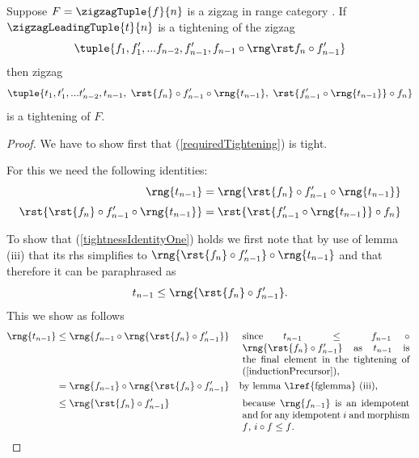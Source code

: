 {  %
   

\newcommand{\requiredTightening}
{\tuple{t_1,t'_1,...t'_{n-2},t_{n-1},\; 
    \rst{f_n} \circ f'_{n-1} \circ \rng{t_{n-1}},\; 
    \rst{f'_{n-1} \circ \rng{t_{n-1}}} \circ f_n
    }
}

\begin{lemma}

Suppose  $F=\zigzagTuple{f}{n}$ is a zigzag in range category \catcw.
If  $\zigzagLeadingTuple{t}{n}$ is a tightening of the zigzag
\begin{equation}
\label{inductionPrecursor}
\tuple{\tightlead}
\end{equation}
then  zigzag
\begin{equation}
\label{requiredTightening}\requiredTightening
\end{equation}
is a tightening of $F$. 


\end{lemma}
\begin{proof}
We have to show first that (\ref{requiredTightening}) is tight. 

For this we need the following identities:
\begin{align}
\label{tightnessIdentityOne}
\rng{t_{n-1}} &= \rng{\rst{f_n} \circ f'_{n-1} \circ \rng{t_{n-1}}}  \\[0.1cm]
\label{tightnessIdentityTwo}
\rst{\rst{f_n} \circ f'_{n-1} \circ \rng{t_{n-1}}}&=\rst{\rst{f'_{n-1} \circ \rng{t_{n-1}}} \circ f_n}
\end{align}

To show that (\ref{tightnessIdentityOne}) holds 
we first note that by use of lemma  (iii) 
that its rhs simplifies to 
$\rng{\rst{f_n} \circ f'_{n-1}} \circ \rng{t_{n-1}}$ 
and that therefore  it
can be paraphrased as
\[
t_{n-1} \leq \rng{\rst{f_n} \circ f'_{n-1}}.
\]
This we show as follows
\newcommand{\stepOneReason}{
\parbox[t]{6cm}{
since
$t_{n-1} \leq  f_{n-1} \circ 
       \rng{
                \rst{f_n} \circ f'_{n-1}
                     }
$
as $t_{n-1}$ is the final element in the tightening
of (\ref{inductionPrecursor}),
} }
\newcommand{\stepThreeReason}{
\parbox[t]{6cm}{
because $\rng{f_{n-1}}$ is an idempotent
and 
for any idempotent $i$ and morphism $f$, $i \circ f \leq f$.
} }
\begin{align*}
\rng{t_{n-1}} &\leq  \rng{
       f_{n-1} \circ 
       \rng{
                \rst{f_n} \circ f'_{n-1}
                     }
                                      }
        && \mbox{\stepOneReason}\\
         &= \rng{f_{n-1}} \circ 
                      \rng{
                           \rst{f_n} \circ f'_{n-1}
                                    }
        && \mbox{by lemma \lref{fglemma} (iii),}\\[0.1cm]  
    &\leq  \rng{\rst{f_n} \circ f'_{n-1}}
        && \mbox{\stepThreeReason}
\end{align*}


\end{proof}}
